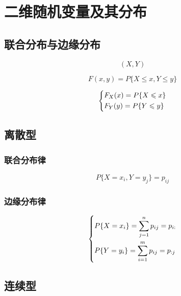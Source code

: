 \chapter{二维随机变量及其分布}

\section{联合分布与边缘分布}
\label{sec:二维随机变量的联合分布与边缘分布}

\begin{definition}[二维随机变量]
    \[
        (X, Y)
    \]
\end{definition}

\begin{definition}[联合分布函数]
    \[
        F(x,y) = P\{ X \leqslant x, Y \leqslant y \}
    \]
\end{definition}

\begin{definition}
    \[
        \begin{dcases}
            F_X(x) = P\{ X \leqslant x  \} \\
            F_Y(y) = P\{ Y \leqslant y  \}
        \end{dcases}
    \]
\end{definition}

\section{离散型}
\label{sec:离散型}

\subsection{联合分布律}
\label{sub:联合分布律}

\[
    P\{ X = x_i, Y = y_j \} = p_{ij}
\]

\subsection{边缘分布律}
\label{sub:边缘分布律}

\[
    \begin{dcases}
        P \{ X = x_i \} = \sum_{j = 1}^n p_{ij} = p_{i:} \\
        P \{ Y = y_i \} = \sum_{i = 1}^m p_{ij} = p_{:j}
    \end{dcases}
\]

\section{连续型}
\label{sec:连续型}

